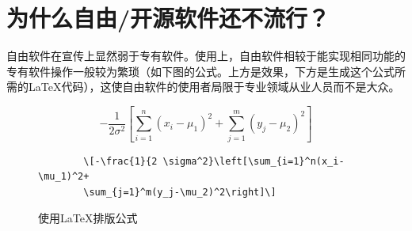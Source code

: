 \section{为什么自由/开源软件还不流行？}
自由软件在宣传上显然弱于专有软件。使用上，自由软件相较于能实现相同功能的专有软件操作一般较为繁琐（如下图的公式。上方是效果，下方是生成这个公式所需的\LaTeX 代码），这使自由软件的使用者局限于专业领域从业人员而不是大众。
\begin{figure}[h]
\centering
 \begin{minipage}{7cm}
		\[-\frac{1}{2 \sigma^2}\left[\sum_{i=1}^n(x_i-\mu_1)^2+\sum_{j=1}^m(y_j-\mu_2)^2\right]\]
		\begin{verbatim}
		\[-\frac{1}{2 \sigma^2}\left[\sum_{i=1}^n(x_i-\mu_1)^2+
		\sum_{j=1}^m(y_j-\mu_2)^2\right]\]
		\end{verbatim}
	\end{minipage}
	\caption{使用\LaTeX 排版公式}
\end{figure}